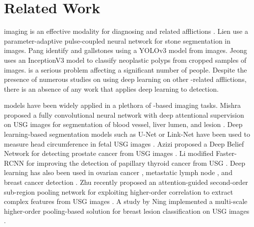 
\section{Related Work}

%
\usg imaging is an effective modality for diagnosing \gbc and related \gb afflictions \cite{yuan2018gbcManual}. 
Lien \etal \cite{gbAutomatic} use a parameter-adaptive pulse-coupled neural network for \gb stone segmentation in \usg images. Pang \etal \cite{gbYolo} identify \gb and gallstones using a YOLOv3 model from \ct images. %
Jeong \etal \cite{gbPolyp2} uses an InceptionV3 model to classify neoplastic polyps from cropped samples of \gb \usg images. \gbc is a serious problem affecting a significant number of people. Despite the presence of numerous studies on using deep learning on other \gb-related afflictions, there is an absence of any work that applies deep learning to \gbc detection.

%
\cnn models have been widely applied in a plethora of \usg-based imaging tasks.
Mishra \etal proposed a fully convolutional neural network with deep attentional supervision on USG images for segmentation of blood vessel, liver lumen, and lesion \cite{mishra2018USSegmentation}. Deep learning-based segmentation models such as U-Net or Link-Net have been used to measure head circumference in fetal USG images \cite{budd2019FetalHC, sobhaninia2019FetalHC}. %
Azizi \etal proposed a Deep Belief Network for detecting prostate cancer from USG images \cite{azizi2015ultrasound}. Li \etal modified Faster-RCNN for improving the detection of papillary thyroid cancer from USG \cite{li2018improved}. Deep learning has also been used in ovarian cancer \cite{zhang2019improved}, metastatic lymph node \cite{lee2018deep}, and breast cancer detection \cite{almajalid2018development, becker2018classification, cao2019BreastLesion, yap2018breast}. Zhu \etal recently proposed an attention-guided second-order sub-region pooling network for exploiting higher-order correlation to extract complex features from USG images \cite{zhu2020second}. A study by Ning \etal implemented a multi-scale higher-order pooling-based solution for breast lesion classification on USG images \cite{ning2020multi} .

